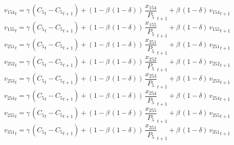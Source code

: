 \begin{dmath}
{{v_{154}}}_{t}={{\gamma}}\, \left({{C_{5}}}_{t}-{{C_{5}}}_{t+1}\right)+\left(1-{{\beta}}\, \left(1-{{\delta}}\right)\right)\, {{\frac{x_{154}}{P_{5}}}}_{t+1}+{{\beta}}\, \left(1-{{\delta}}\right)\, {{v_{154}}}_{t+1}
\end{dmath}
\begin{dmath}
{{v_{155}}}_{t}={{\gamma}}\, \left({{C_{5}}}_{t}-{{C_{5}}}_{t+1}\right)+\left(1-{{\beta}}\, \left(1-{{\delta}}\right)\right)\, {{\frac{x_{155}}{P_{5}}}}_{t+1}+{{\beta}}\, \left(1-{{\delta}}\right)\, {{v_{155}}}_{t+1}
\end{dmath}
\begin{dmath}
{{v_{251}}}_{t}={{\gamma}}\, \left({{C_{5}}}_{t}-{{C_{5}}}_{t+1}\right)+\left(1-{{\beta}}\, \left(1-{{\delta}}\right)\right)\, {{\frac{x_{251}}{P_{5}}}}_{t+1}+{{\beta}}\, \left(1-{{\delta}}\right)\, {{v_{251}}}_{t+1}
\end{dmath}
\begin{dmath}
{{v_{252}}}_{t}={{\gamma}}\, \left({{C_{5}}}_{t}-{{C_{5}}}_{t+1}\right)+\left(1-{{\beta}}\, \left(1-{{\delta}}\right)\right)\, {{\frac{x_{252}}{P_{5}}}}_{t+1}+{{\beta}}\, \left(1-{{\delta}}\right)\, {{v_{252}}}_{t+1}
\end{dmath}
\begin{dmath}
{{v_{253}}}_{t}={{\gamma}}\, \left({{C_{5}}}_{t}-{{C_{5}}}_{t+1}\right)+\left(1-{{\beta}}\, \left(1-{{\delta}}\right)\right)\, {{\frac{x_{253}}{P_{5}}}}_{t+1}+{{\beta}}\, \left(1-{{\delta}}\right)\, {{v_{253}}}_{t+1}
\end{dmath}
\begin{dmath}
{{v_{254}}}_{t}={{\gamma}}\, \left({{C_{5}}}_{t}-{{C_{5}}}_{t+1}\right)+\left(1-{{\beta}}\, \left(1-{{\delta}}\right)\right)\, {{\frac{x_{254}}{P_{5}}}}_{t+1}+{{\beta}}\, \left(1-{{\delta}}\right)\, {{v_{254}}}_{t+1}
\end{dmath}
\begin{dmath}
{{v_{255}}}_{t}={{\gamma}}\, \left({{C_{5}}}_{t}-{{C_{5}}}_{t+1}\right)+\left(1-{{\beta}}\, \left(1-{{\delta}}\right)\right)\, {{\frac{x_{255}}{P_{5}}}}_{t+1}+{{\beta}}\, \left(1-{{\delta}}\right)\, {{v_{255}}}_{t+1}
\end{dmath}
\begin{dmath}
{{v_{351}}}_{t}={{\gamma}}\, \left({{C_{5}}}_{t}-{{C_{5}}}_{t+1}\right)+\left(1-{{\beta}}\, \left(1-{{\delta}}\right)\right)\, {{\frac{x_{351}}{P_{5}}}}_{t+1}+{{\beta}}\, \left(1-{{\delta}}\right)\, {{v_{351}}}_{t+1}
\end{dmath}
